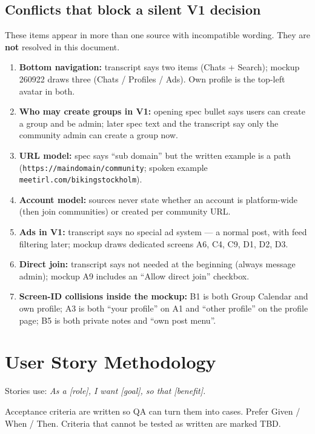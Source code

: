 \documentclass[11pt,a4paper]{article}
\begin{document}
\subsection{Conflicts that block a silent V1 decision}
These items appear in more than one source with incompatible wording. They are \textbf{not} resolved in this document.

\begin{enumerate}[leftmargin=1.6em]
  \item \textbf{Bottom navigation:} transcript says two items (Chats + Search); mockup 260922 draws three (Chats / Profiles / Ads). Own profile is the top-left avatar in both.
  \item \textbf{Who may create groups in V1:} opening spec bullet says users can create a group and be admin; later spec text and the transcript say only the community admin can create a group now.
  \item \textbf{URL model:} spec says ``sub domain'' but the written example is a path (\texttt{https://maindomain/community}; spoken example \texttt{meetirl.com/bikingstockholm}).
  \item \textbf{Account model:} sources never state whether an account is platform-wide (then join communities) or created per community URL.
  \item \textbf{Ads in V1:} transcript says no special ad system --- a normal post, with feed filtering later; mockup draws dedicated screens A6, C4, C9, D1, D2, D3.
  \item \textbf{Direct join:} transcript says not needed at the beginning (always message admin); mockup A9 includes an ``Allow direct join'' checkbox.
  \item \textbf{Screen-ID collisions inside the mockup:} B1 is both Group Calendar and own profile; A3 is both ``your profile'' on A1 and ``other profile'' on the profile page; B5 is both private notes and ``own post menu''.
\end{enumerate}

\section{User Story Methodology}
Stories use: \textit{As a [role], I want [goal], so that [benefit].}

Acceptance criteria are written so QA can turn them into cases. Prefer Given / When / Then. Criteria that cannot be tested as written are marked TBD.
\end{document}

